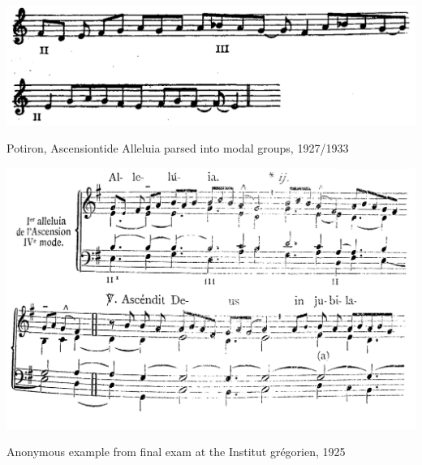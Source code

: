 \vspace*{\fill}

\newpage

\vspace*{\fill}


\begin{example}
  \centering
  \includegraphics[width=\linewidth]{c/4/ex/potiron_parse.png}
  \caption{Potiron, Ascensiontide Alleluia parsed into modal groups, 1927/1933}
  \label{mus:potiron_parse}
\end{example}

\vspace*{\fill}

\begin{example}
  \centering
  \includegraphics[width=\linewidth]{c/4/ex/examen1925.jpg}
  \caption{Anonymous example from final exam at the Institut grégorien, 1925}
  \label{mus:examen1925}
\end{example}

\vspace*{\fill}

\newpage

\vspace*{\fill}


